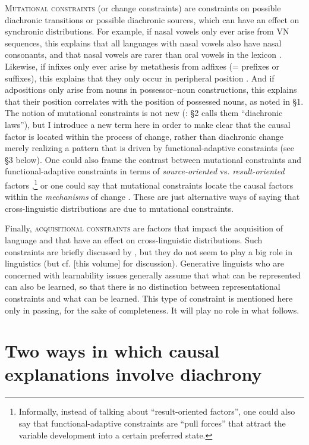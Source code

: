 \documentclass[output=paper]{langsci/langscibook}
\begin{document}
\textsc{Mutational constraints} (or change constraints) are constraints on possible diachronic transitions or possible diachronic sources, which can have an effect on synchronic distributions. For example, if nasal vowels only ever arise from VN sequences, this explains that all languages with nasal vowels also have nasal consonants, and that nasal vowels are rarer than oral vowels in the lexicon \citep{Greenberg1978}. Likewise, if infixes only ever arise by metathesis from adfixes (= prefixes or suffixes), this explains that they only occur in peripheral position \citep[51]{Plank2007}. And if adpositions only arise from nouns in possessor–noun constructions, this explains that their position correlates with the position of possessed nouns, as noted in §1. The notion of mutational constraints is not new (\citealt{Plank2007}: §2 calls them “diachronic laws”), but I introduce a new term here in order to make clear that the causal factor is located within the process of change, rather than diachronic change merely realizing a pattern that is driven by functional-adaptive constraints (see §3 below). One could also frame the contrast between mutational constraints and functional-adaptive constraints in terms of \textit{source-oriented} vs. \textit{result-oriented} factors \citep{Cristofaro2017},\footnote{Informally, instead of talking about “result-oriented factors”, one could also say that functional-adaptive constraints are “pull forces” that attract the variable development into a certain preferred state.} or one could say that mutational constraints locate the causal factors within the \textit{mechanisms} of change \citep{Bybee2006}. These are just alternative ways of saying that cross-linguistic distributions are due to mutational constraints.

Finally, \textsc{acquisitional constraints} are factors that impact the acquisition of language and that have an effect on cross-linguistic distributions. Such constraints are briefly discussed by \citet{Anderson2016}, but they do not seem to play a big role in linguistics (but cf. \citealt{Levshina2018} [this volume] for discussion). Generative linguists who are concerned with learnability issues generally assume that what can be represented can also be learned, so that there is no distinction between representational constraints and what can be learned. This type of constraint is mentioned here only in passing, for the sake of completeness. It will play no role in what follows.

\section{Two ways in which causal explanations involve diachrony}
\end{document}
